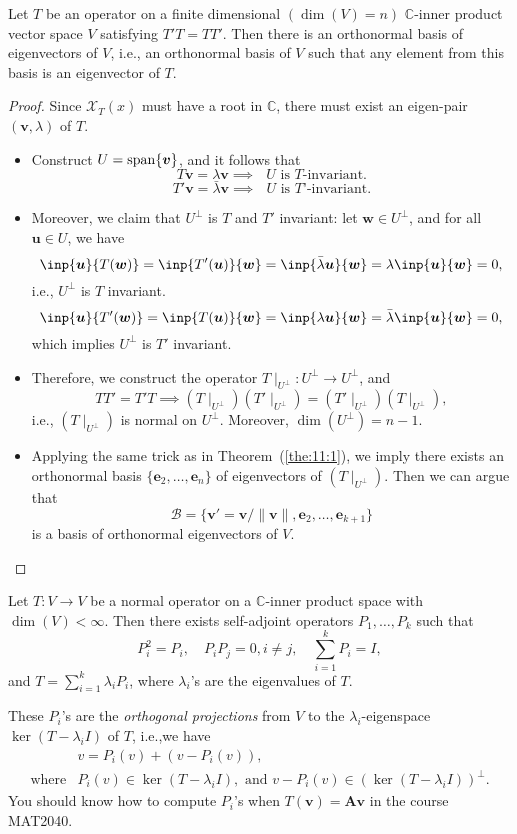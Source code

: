 \begin{theorem}\label{The:12:1}
Let $T$ be an operator on a finite dimensional $(\dim(V)=n)$ $\mathbb{C}$-inner product vector space $V$ satisfying $T'T=TT'$.
Then there is an orthonormal basis of eigenvectors of $V$,
i.e., an orthonormal basis of $V$ such that any element from this basis is an eigenvector of $T$.
\end{theorem}

\begin{proof}
Since $\mathcal{X}_T(x)$ must have a root in $\mathbb{C}$, there must exist an eigen-pair $(\bm v,\lambda)$ of $T$.
\begin{itemize}
\item
Construct $U=\operatorname{span}\{\bm v\}$, and it follows that
\[
T\bm v=\lambda\bm v\implies\text{ $U$ is $T$-invariant}.
\] 
\[
T'\bm v=\bar{\lambda}\bm v\implies\text{ $U$ is $T$'-invariant}.
\] 
\item
Moreover, we claim that $U^\perp$ is $T$ and $T'$ invariant:
let $\bm w\in U^\perp$, and for all $\bm u\in U$, we have
\[
\inp{\bm u}{T(\bm w)}=\inp{T'(\bm u)}{\bm w}=\inp{\bar{\lambda}\bm u}{\bm w}
=\lambda\inp{\bm u}{\bm w}=0,
\]
i.e., $U^\perp$ is $T$ invariant. 
\[
\inp{\bm u}{T'(\bm w)}=\inp{T(\bm u)}{\bm w}=\inp{\lambda\bm u}{\bm w}=\bar{\lambda}\inp{\bm u}{\bm w}=0,
\]
which implies $U^\perp$ is $T'$ invariant.
\item
Therefore, we construct the operator $T\mid_{U^\perp}:U^\perp\to U^\perp$, and 
\[
TT'=T'T\implies
(T\mid_{U^\perp})(T'\mid_{U^\perp})=(T'\mid_{U^\perp})(T\mid_{U^\perp}),
\]
i.e., $(T\mid_{U^\perp})$ is normal on $U^{\perp}$. Moreover, $\dim(U^\perp)=n-1$.
\item
Applying the same trick as in Theorem~(\ref{the:11:1}), we imply there exists an orthonormal basis
$\{\bm e_2,\dots,\bm e_n\}$ of eigenvectors of $(T\mid_{U^\perp})$.
Then we can argue that 
\[
\mathcal{B}=\{\bm v'=\bm v/\|\bm v\|, \bm e_2,\dots,\bm e_{k+1}\}
\]
is a basis of orthonormal eigenvectors of $V$.
\end{itemize}
\end{proof}

\begin{corollary}\label{cor:12:1}
Let $T:V\to V$ be a normal operator on a $\mathbb{C}$-inner product space with $\dim(V)<\infty$.
Then there exists self-adjoint operators $P_1,\dots,P_k$ such that
\[
P_i^2=P_i,\quad
P_iP_j=0, i\ne j,\quad
\sum_{i=1}^kP_i=I,
\]
and $T=\sum_{i=1}^k\lambda_iP_i$, where $\lambda_i$'s are the eigenvalues of $T$.
\end{corollary}
\begin{remark}
These $P_i$'s are the \emph{orthogonal projections} from $V$ to the $\lambda_i$-eigenspace $\ker(T-\lambda_i I)$ of $T$, i.e.,we have
\[
\begin{array}{ll}
&v = P_i(v) + (v- P_i(v)),\\
\text{where}&P_i(v) \in \ker(T - \lambda_i I) ,\text{ and }v - P_i(v) \in (\ker(T - \lambda_i I))^{\perp}.
\end{array}
\]
You should know how to compute $P_i$'s when $T(\bm v) = \bm A\bm v$ in the course MAT2040.
\end{remark}

